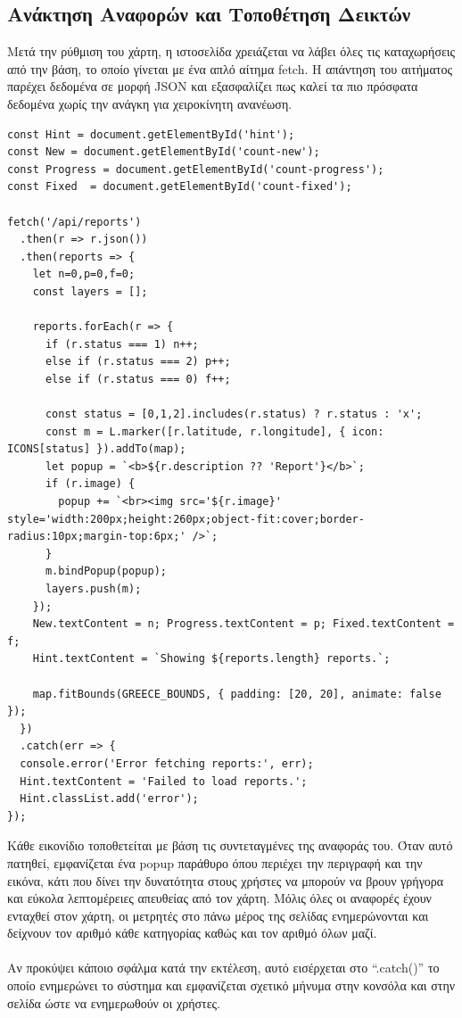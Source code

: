 \subsection{Ανάκτηση Αναφορών και Τοποθέτηση Δεικτών}
Μετά την ρύθμιση του χάρτη, η ιστοσελίδα χρειάζεται να λάβει όλες τις καταχωρήσεις από την βάση, το οποίο γίνεται με ένα απλό αίτημα fetch. Η απάντηση του αιτήματος παρέχει δεδομένα σε μορφή JSON και εξασφαλίζει πως καλεί τα πιο πρόσφατα δεδομένα χωρίς την ανάγκη για χειροκίνητη ανανέωση.
\\
\begin{lstlisting}
const Hint = document.getElementById('hint');
const New = document.getElementById('count-new');
const Progress = document.getElementById('count-progress');
const Fixed  = document.getElementById('count-fixed');

fetch('/api/reports')
  .then(r => r.json())
  .then(reports => {
    let n=0,p=0,f=0;
    const layers = [];

    reports.forEach(r => {
      if (r.status === 1) n++;
      else if (r.status === 2) p++;
      else if (r.status === 0) f++;
      
      const status = [0,1,2].includes(r.status) ? r.status : 'x';
      const m = L.marker([r.latitude, r.longitude], { icon: ICONS[status] }).addTo(map);
      let popup = `<b>${r.description ?? 'Report'}</b>`;
      if (r.image) {
        popup += `<br><img src='${r.image}' style='width:200px;height:260px;object-fit:cover;border-radius:10px;margin-top:6px;' />`;
      }
      m.bindPopup(popup);
      layers.push(m);
    });
    New.textContent = n; Progress.textContent = p; Fixed.textContent = f;
    Hint.textContent = `Showing ${reports.length} reports.`;

    map.fitBounds(GREECE_BOUNDS, { padding: [20, 20], animate: false });
  })
  .catch(err => {
  console.error('Error fetching reports:', err);
  Hint.textContent = 'Failed to load reports.';
  Hint.classList.add('error');
});
\end{lstlisting}
\newpage
Κάθε εικονίδιο τοποθετείται με βάση τις συντεταγμένες της αναφοράς του. Όταν αυτό πατηθεί, εμφανίζεται ένα popup παράθυρο όπου περιέχει την περιγραφή και την εικόνα, κάτι που δίνει την δυνατότητα στους χρήστες να μπορούν να βρουν γρήγορα και εύκολα λεπτομέρειες απευθείας από τον χάρτη. Μόλις όλες οι αναφορές έχουν ενταχθεί στον χάρτη, οι μετρητές στο πάνω μέρος της σελίδας ενημερώνονται και δείχνουν τον αριθμό κάθε κατηγορίας καθώς και τον αριθμό όλων μαζί. 
\\
\\
Αν προκύψει κάποιο σφάλμα κατά την εκτέλεση, αυτό εισέρχεται στο “.catch()” το οποίο ενημερώνει το σύστημα και εμφανίζεται σχετικό μήνυμα στην κονσόλα και στην σελίδα ώστε να ενημερωθούν οι χρήστες.

